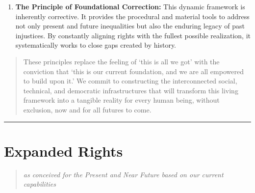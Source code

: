 \begin{enumerate}
  advancement in the human capacity to improve life, reduce suffering,
  or enhance freedom---if it can be sustainably generalized---creates a
  corresponding obligation to generalize it. The artificial,
  capacity-driven division of humanity into those who enjoy the fruits
  of collective advancement and those who do not is hereby declared a
  fundamental injustice. The framework seeks to dissolve the antiquated
  dichotomy between ``justiciable'' civil rights and ``progressively
  realized'' socio-economic rights by building infrastructures that make
  the full spectrum of human potential reliably deliverable, and thus
  enforceable.
\item
  \textbf{The Principle of Foundational Correction:} This dynamic
  framework is inherently corrective. It provides the procedural and
  material tools to address not only present and future inequalities but
  also the enduring legacy of past injustices. By constantly aligning
  rights with the fullest possible realization, it systematically works
  to close gaps created by history.
\end{enumerate}

\begin{quote}
These principles replace the feeling of `this is all we got' with the
conviction that `this is our current foundation, and we are all
empowered to build upon it.' We commit to constructing the
interconnected social, technical, and democratic infrastructures that
will transform this living framework into a tangible reality for every
human being, without exclusion, now and for all futures to come.
\end{quote}

\begin{center}\rule{0.5\linewidth}{0.5pt}\end{center}

\section{Expanded Rights}\label{expanded-rights}

\begin{quote}
\emph{as conceived for the Present and Near Future based on our current
capabilities}
\end{quote}

